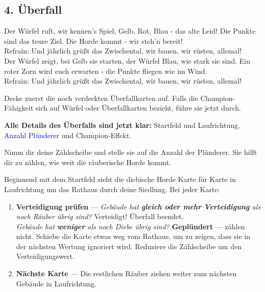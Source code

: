 \documentclass[11pt]{article}
\begin{document}
\begin{lumenpage}
\par\vspace{16pt}

\chapter{4. Überfall}

\begin{lumenquote}
Der Würfel ruft, wir kennen’s Spiel,
Gelb, Rot, Blau - das alte Leid!
Die Punkte sind das teure Ziel.
Die Horde kommt - wir steh’n bereit!
\\
Refrain:
Und jährlich grüßt das Zwischental,
wir bauen, wir rüsten, allemal!
\\
Der Würfel zeigt, bei Gelb sie starten,
der Würfel Blau, wie stark sie sind.
Ein roter Zorn wird euch erwarten -
die Punkte fliegen wie im Wind.
\\
Refrain:
Und jährlich grüßt das Zwischental,
wir bauen, wir rüsten, allemal!
\end{lumenquote}

\columnbreak


Decke zuerst die noch verdeckten Überfallkarten auf. Falls die \textcolor{LumenClayDark}{Champion-Fähigkeit} sich auf Würfel oder Überfallkarten bezieht, führe sie jetzt durch.\\

\par\vspace{4pt}

\textbf{Alle Details des Überfalls sind jetzt klar:} \textcolor{LumenGold}{Startfeld} und \textcolor{LumenGold}{Laufrichtung}, \textcolor{blue}{Anzahl Plünderer} und \textcolor{LumenClayDark}{Champion-Effekt}.


Nimm dir deine Zählscheibe und stelle sie auf die Anzahl der Plünderer. Sie hilft dir zu zählen, wie weit die räuberische Horde kommt.

Beginnend mit dem Startfeld zieht die diebische Horde Karte für Karte in Laufrichtung um das Rathaus durch deine Siedlung. Bei jeder Karte:

\begin{enumerate}
\item \textbf{Verteidigung prüfen} --- \textit{Gebäude hat \textbf{gleich oder mehr} \lumenDef\textbf{ Verteidigung} als noch Räuber übrig sind?} Verteidigt! Überfall beendet.\\
\textit{Gebäude hat \textbf{weniger} \lumenDef\textbf{} als noch Diebe übrig sind?} \lumenPlundered\textbf{ Geplündert} --- \lumenVP\textbf{} zählen nicht. Schiebe die Karte etwas weg vom Rathaus, um zu zeigen, dass sie in der nächsten Wertung ignoriert wird. Reduziere die Zählscheibe um den Verteidigungswert.
\item \textbf{Nächste Karte} --- Die restlichen Räuber ziehen weiter zum nächsten Gebäude in Laufrichtung.
\end{enumerate}


\end{lumenpage}
\end{document}
